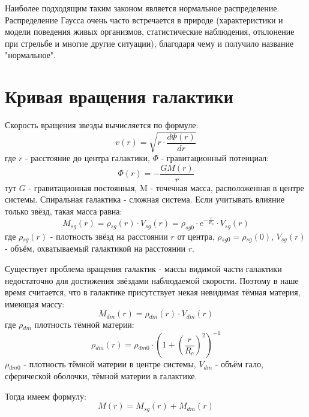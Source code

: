 Наиболее подходящим таким законом является нормальное распределение. Распределение Гаусса очень часто встречается в природе (характеристики и модели поведения живых организмов, статистические наблюдения, отклонение при стрельбе и многие другие ситуации), благодаря чему и получило название "нормальное".

\section{Кривая вращения галактики}
Скорость вращения звезды вычисляется по формуле\cite{landau}:
\begin{equation}
    v(r) = \sqrt{r \cdot{} \frac{d\Phi{}(r)}{dr}}
\end{equation}
где $r$ - расстояние до центра галактики, $\Phi{}$ - гравитационный потенциал\cite{volders}:
\begin{equation}
    \Phi{}(r) = -\frac{GM(r)}{r}
\end{equation}
тут $G$ - гравитационная постоянная, M - точечная масса, расположенная в центре системы. Спиральная галактика - сложная система. Если учитывать влияние только звёзд, такая масса равна:
\begin{equation}
    M_{sg}(r) = \rho{}_{sg}(r) \cdot{} V_{sg}(r) = \rho_{sg0} \cdot{} e^{-\frac{r}{R_h}} \cdot{} V_{sg}(r)
\end{equation}
где $\rho{}_{sg}(r)$ - плотность звёзд на расстоянии $r$ от центра, $\rho{}_{sg0} = \rho{}_{sg}(0)$, $V_{sg}(r)$ - объём, охватываемый галактикой на расстоянии $r$.

Существует проблема вращения галактик - массы видимой части галактики недостаточно для достижения звёздами наблюдаемой скорости. Поэтому в наше время считается, что в галактике присутствует некая невидимая тёмная материя, имеющая массу:
\begin{equation}
    M_{dm}(r) = \rho{}_{dm}(r) \cdot{} V_{dm}(r)
\end{equation}
где $\rho{}_{dm}$ плотность тёмной материи:
\begin{equation}
    \rho{}_{dm}(r) = \rho{}_{dm0} \cdot{} (1 + (\frac{r}{R_c})^2)^{-1}
\end{equation}
$\rho{}_{dm0}$ - плотность тёмной материи в центре системы, $V_{dm}$ - объём гало, сферической оболочки, тёмной материи в галактике.

Тогда имеем формулу:
\begin{equation}
    M(r) = M_{sg}(r) + M_{dm}(r)
\end{equation}

